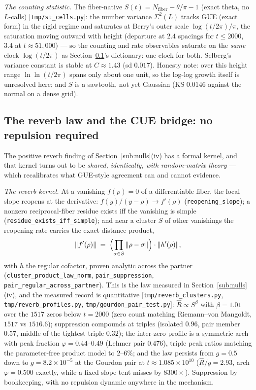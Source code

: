 \documentclass[11pt]{article}
\newcommand{\code}[1]{\texttt{#1}}
\begin{document}
\emph{The counting statistic.}  The fiber-native $S(t)=N_{\mathrm{fiber}}-\theta/\pi-1$ (exact
theta, no $L$-calls) [\code{tmp/st\_cells.py}]: the number variance $\Sigma^2(L)$ tracks GUE
(exact form) in the rigid regime and saturates at Berry's outer scale $\log(t/2\pi)/\pi$, the
saturation moving outward with height (departure at $2.4$ spacings for $t\le2000$, $3.4$ at
$t\approx51{,}000$) --- so the counting and rate observables saturate on the \emph{same} clock
$\log(t/2\pi)$ as Section~\ref{sub:cuebridge}'s dictionary: one clock for both.  Selberg's
variance constant is stable at $C\approx1.43$ (sd $0.017$).  Honesty note: over this height range
$\ln\ln(t/2\pi)$ spans only about one unit, so the log-log growth itself is unresolved here; and
$S$ is a sawtooth, not yet Gaussian (KS $0.0146$ against the normal on a dense grid).

\subsection{The reverb law and the CUE bridge: no repulsion required}\label{sub:cuebridge}

The positive reverb finding of Section~\ref{sub:nulls}(iv) has a formal kernel, and that kernel
turns out to be \emph{shared, identically, with random-matrix theory} --- which recalibrates what
GUE-style agreement can and cannot evidence.

\emph{The reverb kernel.}  At a vanishing $f(\rho)=0$ of a differentiable fiber, the local slope
reopens at the derivative: $f(y)/(y-\rho)\to f'(\rho)$ (\code{reopening\_slope}); a nonzero
reciprocal-fiber residue exists iff the vanishing is simple (\code{residue\_exists\_iff\_simple});
and near a cluster $S$ of other vanishings the reopening rate carries the exact distance product,
\[
  \|f'(\rho)\| \;=\; \Bigl(\prod_{\sigma\in S}\|\rho-\sigma\|\Bigr)\cdot\|h'(\rho)\|,
\]
with $h$ the regular cofactor, proven analytic across the partner
(\code{cluster\_product\_law\_norm}, \code{pair\_suppression},
\code{pair\_regular\_across\_partner}).  This is the law measured in
Section~\ref{sub:nulls}(iv), and the measured record is quantitative
[\code{tmp/reverb\_clusters.py}, \code{tmp/reverb\_profiles.py}, \code{tmp/gourdon\_pair\_test.py}]:
$\hat R\propto S^{\beta}$ with $\beta=1.01$ over the $1517$ zeros below $t=2000$ (zero count
matching Riemann--von Mangoldt, $1517$ vs $1516.6$); suppression compounds at triples (isolated
$0.96$, pair member $0.57$, middle of the tightest triple $0.32$); the inter-zero profile is a
symmetric arch with peak fraction $\varphi=0.44$--$0.49$ (Lehmer pair $0.476$), triple peak ratios
matching the parameter-free product model to $2$--$6\%$; and the law persists from $g=0.5$ down to
$g=8.2\times10^{-5}$ at the Gourdon pair at $t\approx1.085\times10^{10}$ ($\hat R/g=2.93$, arch
$\varphi=0.500$ exactly, while a fixed-slope tent misses by $8300\times$).  Suppression by
bookkeeping, with no repulsion dynamic anywhere in the mechanism.
\end{document}
